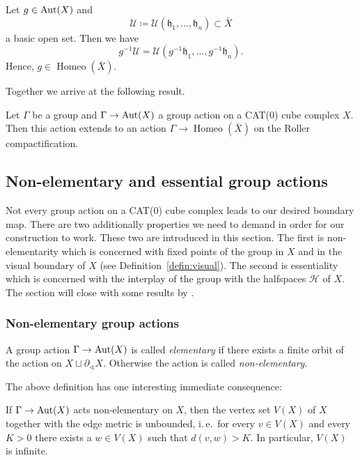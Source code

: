 \begin{lemma}
  Let \(g \in \operatorname{Aut}(X)\) and \[
    \mathcal{U} \coloneqq \mathcal{U}(\mathfrak{h}_1, \dots, \mathfrak{h}_n) \subset \bar X
  \]
  a basic open set. Then we have
  \[
    g^{-1} \mathcal{U} = \mathcal{U}(g^{-1}\mathfrak{h}_1, \dots, g^{-1}\mathfrak{h}_n).
  \]
  Hence, \(g \in \operatorname{Homeo}(\bar X)\).
\end{lemma}

Together we arrive at the following result.

\begin{thm}
  \label{thm:roller-action}
  Let \(\Gamma\) be a group and \(\Gamma \to \operatorname{Aut}(X)\) a group action on a CAT(0) cube complex \(X\). Then this action extends to an action \(\Gamma \to \operatorname{Homeo}(\bar X)\) on the Roller compactification.
\end{thm}

\subsection{Non-elementary and essential group actions}
\label{sec:special}

Not every group action on a CAT(0) cube complex leads to our desired boundary map. There are two additionally properties we need to demand in order for our construction to work. These two are introduced in this section. The first is non-elementarity which is concerned with fixed points of the group in \(X\) and in the visual boundary of \(X\) (see Definition~\ref{defin:visual}). The second is essentiality which is concerned with the interplay of the group with the halfspaces \(\mathcal{H}\) of \(X\). The section will close with some results by \textcite{Caprace2010}.

\subsubsection*{Non-elementary group actions}
\label{non-elementary}

\begin{defin}
  A group action \(\Gamma \to \operatorname{Aut}(X)\) is called \emph{elementary} if there exists a finite orbit of the action on \(X \sqcup \partial_{\sphericalangle}X\). Otherwise the action is called \emph{non-elementary}.
\end{defin}

The above definition has one interesting immediate consequence:
\begin{prop}
  \label{prop:ne-unbounded}
  If \(\Gamma \to \operatorname{Aut}(X)\) acts non-elementary on \(X\), then the vertex set \(V(X)\) of \(X\) together with the edge metric is unbounded, i.\,e.\ for every \(v \in V(X)\) and every \(K>0\) there exists a \(w \in V(X)\) such that \(d(v,w)>K\). In particular, \(V(X)\) is infinite.
\end{prop}

